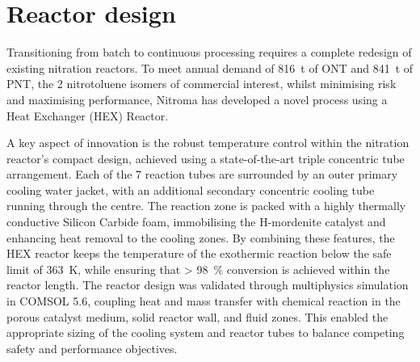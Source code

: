 \section*{Reactor design}
Transitioning from batch to continuous processing requires a complete redesign of existing nitration reactors. To meet annual demand of \SI{816}{\tonne} of ONT and \SI{841}{\tonne} of PNT, the 2 nitrotoluene isomers of commercial interest, whilst minimising risk and maximising performance, Nitroma has developed a novel process using a Heat Exchanger (HEX) Reactor.

A key aspect of innovation is the robust temperature control within the nitration reactor's compact design, achieved using a state-of-the-art triple concentric tube arrangement. Each of the 7 reaction tubes are surrounded by an outer primary cooling water jacket, with an additional secondary concentric cooling tube running through the centre. The reaction zone is packed with a highly thermally conductive Silicon Carbide foam, immobilising the H-mordenite catalyst and enhancing heat removal to the cooling zones. By combining these features, the HEX reactor keeps the temperature of the exothermic reaction below the safe limit of \SI{363}{\K}, while ensuring that \SI{> 98}{\percent} conversion is achieved within the reactor length. The reactor design was validated through multiphysics simulation in COMSOL 5.6, coupling heat and mass transfer with chemical reaction in the porous catalyst medium, solid reactor wall, and fluid zones. This enabled the appropriate sizing of the cooling system and reactor tubes to balance competing safety and performance objectives.

